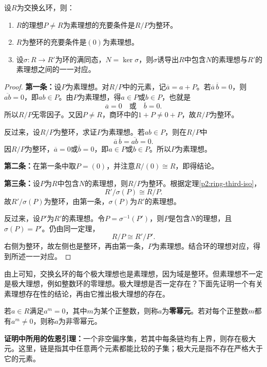 \begin{theorem}\label{p2:prime-domain}
设$R$为交换幺环，则：
\begin{enumerate}
\item $R$的理想$P\ne R$为素理想的充要条件是$R/P$为整环。
\item $R$为整环的充要条件是$(0)$为素理想。
\item 设$\sigma:R\to R'$为环的满同态，$N=\ker\sigma$，则$\sigma$诱导出$R$中包含$N$的素理想与$R'$的素理想之间的一一对应。
\end{enumerate}
\end{theorem}
\begin{proof}
\textbf{第一条：}设$P$为素理想。对$R/P$中的元素，记$\overline a=a+P$。若$\overline a\,\overline b=0$，则$\overline{ab}=0$，即$ab\in P$。由$P$为素理想，得$a\in P$或$b\in P$，也就是
\[
\overline a=0\quad\text{或}\quad\overline b=0.
\]
所以$R/P$无零因子。又因$P\ne R$，商环中的$1+P\ne0+P$，故$R/P$为整环。

反过来，设$R/P$为整环，求证$P$为素理想。若$ab\in P$，则在$R/P$中
\[
\overline a\,\overline b=\overline{ab}=0.
\]
因$R/P$为整环，$\overline a=0$或$\overline b=0$，即$a\in P$或$b\in P$。所以$P$为素理想。

\textbf{第二条：}在第一条中取$P=(0)$，并注意$R/(0)\cong R$，即得结论。

\textbf{第三条：}设$P$为$R$中包含$N$的素理想，则$R/P$为整环。根据定理\ref{p2:ring-third-iso}，
\[
R'/\sigma(P)\cong R/P.
\]
故$R'/\sigma(P)$为整环，由第一条，$\sigma(P)$为$R'$的素理想。

反过来，设$P'$为$R'$的素理想。令$P=\sigma^{-1}(P')$，则$P$是包含$N$的理想，且$\sigma(P)=P'$。仍由同一定理，
\[
R/P\cong R'/P'.
\]
右侧为整环，故左侧也是整环，再由第一条，$P$为素理想。结合环的理想对应，得到所述一一对应。
\end{proof}

由上可知，交换幺环的每个极大理想也是素理想，因为域是整环。但素理想不一定是极大理想，例如整数环的零理想。极大理想是否一定存在？下面先证明一个有关素理想存在性的结论，再由它推出极大理想的存在。

\begin{definition}
若$a\in R$满足$a^m=0$，其中$m$为某个正整数，则称$a$为\textbf{零幂元}。若对每个正整数$m$都有$a^m\ne0$，则称$a$为非零幂元。
\end{definition}

\textbf{证明中所用的佐恩引理：}一个非空偏序集，若其中每条链均有上界，则存在极大元。这里，链是指其中任意两个元素都能比较的子集；极大元是指不存在严格大于它的元素。


